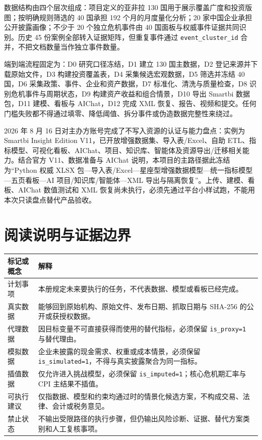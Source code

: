 \documentclass[UTF8,fontset=windows,12pt,openany]{ctexbook}
\newcommand{\Field}[1]{{\small\nolinkurl{#1}}}
\begin{document}
数据结构由四个层次组成：项目定义的亚非拉 130 国用于展示覆盖广度和投资版图；按明确规则筛选的 40 国承担 192 个月的月度量化分析；20 家中国企业承担公开披露画像；不少于 20 个独立危机事件由 40 国面板与权威事件证据共同识别。历史 45 份案例全部转入证据矩阵，但重复事件通过 \Field{event_cluster_id} 合并，不把文档数量当作独立事件数量。

端到端流程固定为：D0 研究口径冻结，D1 建立 130 国主数据，D2 登记来源并下载原始文件，D3 构建投资覆盖表，D4 采集候选宏观数据，D5 筛选并冻结 40 国，D6 采集政策、事件、企业和资产数据，D7 标准化、清洗与质量检查，D8 识别危机事件与周期状态，D9 构建资产收益和组合情景，D10 导出 Smartbi 数据包，D11 建模、看板与 AIChat，D12 完成 XML 恢复、报告、视频和提交。任何门槛失败都不得通过填零、降低阈值、拆分事件或伪造数据完整性来绕过。

2026 年 8 月 16 日对主办方账号完成了不写入资源的认证与能力盘点：实例为 Smartbi Insight Edition V11，已开放增强数据集、导入表/Excel、自助 ETL、指标模型、可视化看板、AIChat、项目、知识库、智能体及资源导出/迁移相关能力。结合官方 V11、数据准备与 AIChat 说明\cite{smartbiversion,smartbiprepare,smartbiaichat}，本项目的主路径据此冻结为“Python 权威 XLSX 包—导入表/Excel—星座型增强数据模型—统一指标模型—五页看板—AI 项目/知识库/智能体—XML 导出与隔离恢复”。上传、建模、看板、AIChat 数值测试和 XML 恢复尚未执行，必须先通过平台小样试跑，不能用本次只读盘点替代产品验收。

\chapter*{阅读说明与证据边界}

\begin{longtable}{p{3.0cm}p{10.5cm}}
\toprule
\textbf{标记或概念} & \textbf{解释}\\
\midrule
计划事项 & 本册规定未来要执行的任务，不代表数据、模型或看板已经完成。\\
真实数据 & 能够回到原始机构、原始文件、发布日期、抓取日期与 SHA-256 的公开或获授权数据。\\
代理数据 & 因目标变量不可直接获得而使用的替代指标，必须保留 \Field{is_proxy=1} 与替代理由。\\
模拟数据 & 企业未披露的现金需求、权重或成本情景，必须保留 \Field{is_simulated=1}，不得与真实披露聚合为同一指标。\\
插值数据 & 仅允许进入挑战模型，必须保留 \Field{is_imputed=1}；核心危机期汇率与 CPI 主结果不插值。\\
可执行建议 & 仅指数据、模型和约束均通过时的情景化候选方案，不构成交易、法律、会计或税务意见。\\
禁止状态 & 不输出受限路径的执行步骤，但仍输出风险诊断、证据、替代方案类别和人工复核事项。\\
\bottomrule
\end{longtable}
\end{document}
